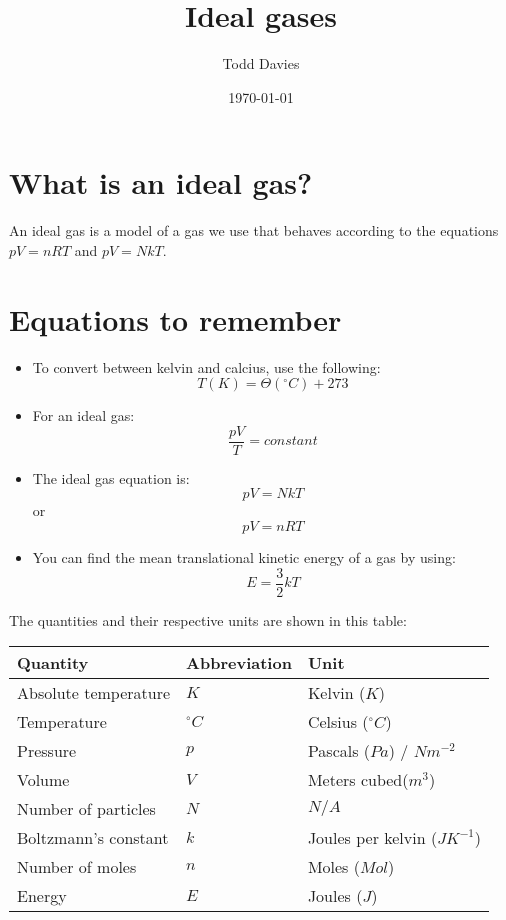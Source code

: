 \documentclass{article}
\title{Ideal gases}
\author{Todd Davies}
\date{\today}
\begin{document}
\lhead{\today}

\maketitle

\section*{What is an ideal gas?}
\thispagestyle{empty}
An ideal gas is a model of a gas we use that behaves according to the equations
$pV = nRT$ and $pV = NkT$.

\section*{Equations to remember}
\begin{itemize}
	\item To convert between kelvin and calcius, use the following:
	\[
		T(K) = \Theta(^\circ C) + 273
	\]
	\item For an ideal gas:
	\[
		\frac{pV}{T} = constant
	\]
	\item The ideal gas equation is:
	\[
		pV = NkT
	\]
	or
	\[
		pV = nRT
	\]
	\item You can find the mean translational kinetic energy of a gas by using:
	\[
		E = \frac{3}{2}kT
	\]
	\end{itemize}

The quantities and their respective units are shown in this table:

\begin{center}
	\begin{tabular}{|l|l|l|}
		\hline
			Quantity & Abbreviation & Unit \\ \hline
			Absolute temperature & $K$ & Kelvin ($K$) \\ \hline
			Temperature & $^\circ C$ & Celsius ($^\circ C$) \\ \hline
			Pressure & $p$ & Pascals ($Pa$) / $Nm^{-2}$ \\ \hline
			Volume & $V$ & Meters cubed($m^3$)\\ \hline
			Number of particles & $N$ & $N/A$\\ \hline
			Boltzmann's constant & $k$ & Joules per kelvin ($JK^{-1}$)\\ \hline
			Number of moles & $n$ & Moles ($Mol$)\\ \hline
			Energy & $E$ & Joules ($J$)\\ \hline
	\end{tabular}
\end{center}
\end{document}

